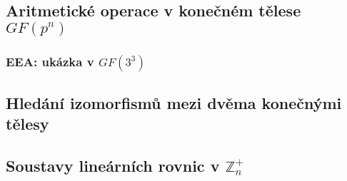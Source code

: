 \documentclass[12pt, letterpaper]{article}
\begin{document}
\subsection{Aritmetické operace v konečném tělese $GF(p^n)$}

\subsubsection*{EEA: ukázka v $GF(3^3)$}


\subsection{Hledání izomorfismů mezi dvěma konečnými tělesy}

\subsection{Soustavy lineárních rovnic v $\mathbb{Z}^+_n$}
\end{document}
